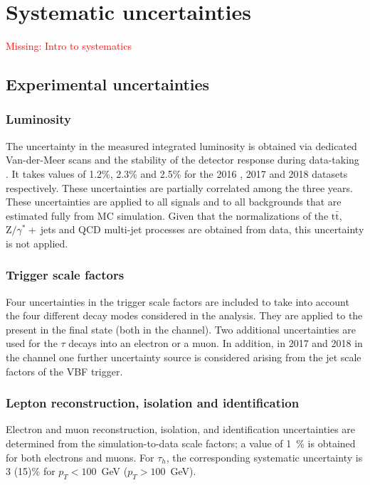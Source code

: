 \documentclass[../main.tex]{subfiles}
\begin{document}
\section{Systematic uncertainties}
\label{hh:sec:systematics}

\textcolor{red}{Missing: Intro to systematics}

\subsection*{Experimental uncertainties}

\subsubsection*{Luminosity}

The uncertainty in the measured integrated luminosity 
is obtained via dedicated Van-der-Meer scans and the stability of the detector response during data-taking \cite{lumi_1516}. It takes values of 1.2\%, 2.3\% and 2.5\% for the 2016 \cite{lumi_2016}, 2017 \cite{lumi_2017} and 2018 \cite{lumi_2018} datasets respectively. These uncertainties are partially correlated among the three years. These uncertainties are applied to all signals and to all backgrounds that are estimated fully from MC simulation. Given that the normalizations of the $\text{t}\bar{\text{t}}$, $\text{Z}/\gamma^*+~$jets and QCD multi-jet processes are obtained from data, this uncertainty is not applied.

\subsubsection*{Trigger scale factors}

Four uncertainties in the trigger scale factors are included to take into account the four different \tauh{} decay modes considered in the analysis. They are applied to the \tauh{} present in the final state (both in the \tauh\tauh{} channel). Two additional uncertainties are used for the $\tau$ decays into an electron or a muon. In addition, in 2017 and 2018 in the \tauh\tauh{} channel one further uncertainty source is considered arising from the jet scale factors of the VBF trigger.


\subsubsection*{Lepton reconstruction, isolation and identification}

Electron and muon reconstruction, isolation, and identification uncertainties are determined 
from the simulation-to-data scale factors; a value of 1~\% is obtained for both electrons and muons. For $\tau_h$, the corresponding systematic uncertainty is 3 (15)\% for $p_T<100$~GeV ($p_T>100$~GeV).
\end{document}
